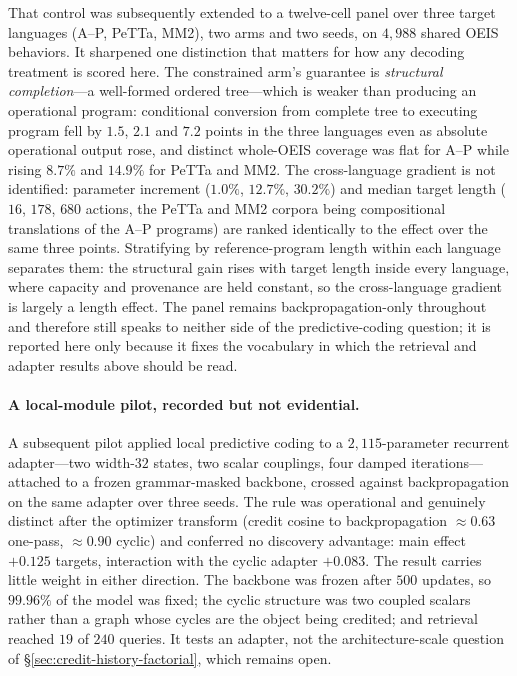 \documentclass[11pt]{article}
\begin{document}
That control was subsequently extended to a twelve-cell panel over three target
languages (A--P, PeTTa, MM2), two arms and two seeds, on $4{,}988$ shared OEIS behaviors.
It sharpened one distinction that matters for how any decoding treatment is scored here.
The constrained arm's guarantee is \emph{structural completion}---a well-formed ordered
tree---which is weaker than producing an operational program: conditional conversion from
complete tree to executing program fell by $1.5$, $2.1$ and $7.2$ points in the three
languages even as absolute operational output rose, and distinct whole-OEIS coverage was
flat for A--P while rising $8.7\%$ and $14.9\%$ for PeTTa and MM2.  The cross-language
gradient is not identified: parameter increment ($1.0\%$, $12.7\%$, $30.2\%$) and median
target length ($16$, $178$, $680$ actions, the PeTTa and MM2 corpora being compositional
translations of the A--P programs) are ranked identically to the effect over the same
three points.  Stratifying by reference-program length within each language separates
them: the structural gain rises with target length inside every language, where capacity
and provenance are held constant, so the cross-language gradient is largely a length
effect.  The panel remains backpropagation-only throughout and therefore still
speaks to neither side of the predictive-coding question; it is reported here only
because it fixes the vocabulary in which the retrieval and adapter results above should
be read.

\paragraph{A local-module pilot, recorded but not evidential.}
A subsequent pilot applied local predictive coding to a $2{,}115$-parameter recurrent
adapter---two width-$32$ states, two scalar couplings, four damped iterations---attached to
a frozen grammar-masked backbone, crossed against backpropagation on the same adapter over
three seeds. The rule was operational and genuinely distinct after the optimizer transform
(credit cosine to backpropagation $\approx0.63$ one-pass, $\approx0.90$ cyclic) and
conferred no discovery advantage: main effect $+0.125$ targets, interaction with the cyclic
adapter $+0.083$. The result carries little weight in either direction. The backbone was
frozen after $500$ updates, so $99.96\%$ of the model was fixed; the cyclic structure was
two coupled scalars rather than a graph whose cycles are the object being credited; and
retrieval reached $19$ of $240$ queries. It tests an adapter, not the architecture-scale
question of \S\ref{sec:credit-history-factorial}, which remains open.
\end{document}
